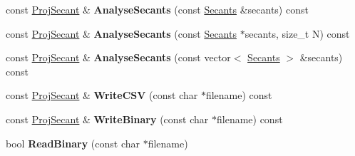 \begin{DoxyCompactItemize}
\item 
\hypertarget{struct_d_r_d_s_p_1_1_proj_secant_a4c12f28ba578c22c206b0d92ad6eb490}{const \hyperlink{struct_d_r_d_s_p_1_1_proj_secant}{Proj\-Secant} \& {\bfseries Analyse\-Secants} (const \hyperlink{struct_d_r_d_s_p_1_1_secants}{Secants} \&secants) const }\label{struct_d_r_d_s_p_1_1_proj_secant_a4c12f28ba578c22c206b0d92ad6eb490}

\item 
\hypertarget{struct_d_r_d_s_p_1_1_proj_secant_af0e2cf457eb340f1b1df392ea161ae14}{const \hyperlink{struct_d_r_d_s_p_1_1_proj_secant}{Proj\-Secant} \& {\bfseries Analyse\-Secants} (const \hyperlink{struct_d_r_d_s_p_1_1_secants}{Secants} $\ast$secants, size\-\_\-t N) const }\label{struct_d_r_d_s_p_1_1_proj_secant_af0e2cf457eb340f1b1df392ea161ae14}

\item 
\hypertarget{struct_d_r_d_s_p_1_1_proj_secant_a314a6742c209f41d347eaf652db24761}{const \hyperlink{struct_d_r_d_s_p_1_1_proj_secant}{Proj\-Secant} \& {\bfseries Analyse\-Secants} (const vector$<$ \hyperlink{struct_d_r_d_s_p_1_1_secants}{Secants} $>$ \&secants) const }\label{struct_d_r_d_s_p_1_1_proj_secant_a314a6742c209f41d347eaf652db24761}

\item 
\hypertarget{struct_d_r_d_s_p_1_1_proj_secant_a1b8c61ea307a758c789ae424cd72006c}{const \hyperlink{struct_d_r_d_s_p_1_1_proj_secant}{Proj\-Secant} \& {\bfseries Write\-C\-S\-V} (const char $\ast$filename) const }\label{struct_d_r_d_s_p_1_1_proj_secant_a1b8c61ea307a758c789ae424cd72006c}

\item 
\hypertarget{struct_d_r_d_s_p_1_1_proj_secant_afbb9d6b0aa69ba44619363a69d7f7cef}{const \hyperlink{struct_d_r_d_s_p_1_1_proj_secant}{Proj\-Secant} \& {\bfseries Write\-Binary} (const char $\ast$filename) const }\label{struct_d_r_d_s_p_1_1_proj_secant_afbb9d6b0aa69ba44619363a69d7f7cef}

\item 
\hypertarget{struct_d_r_d_s_p_1_1_proj_secant_ae37dfe0f561f61c3ecfda5abc02e8b25}{bool {\bfseries Read\-Binary} (const char $\ast$filename)}\label{struct_d_r_d_s_p_1_1_proj_secant_ae37dfe0f561f61c3ecfda5abc02e8b25}

\end{DoxyCompactItemize}
